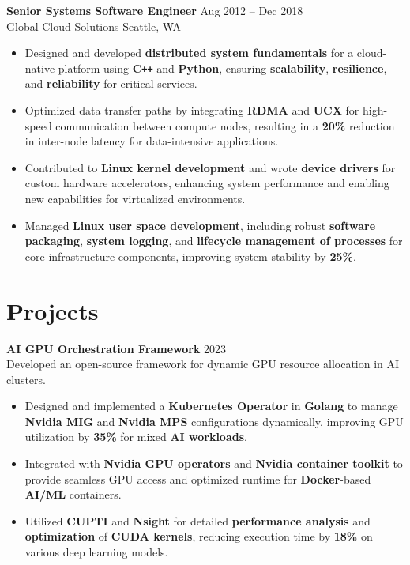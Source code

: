 \documentclass[11pt,a4paper]{article}
\begin{document}
\textbf{Senior Systems Software Engineer} \hfill Aug 2012 – Dec 2018 \\
Global Cloud Solutions \hfill Seattle, WA
\begin{itemize}
    \item Designed and developed \textbf{distributed system fundamentals} for a cloud-native platform using \textbf{C\texttt{++}} and \textbf{Python}, ensuring \textbf{scalability}, \textbf{resilience}, and \textbf{reliability} for critical services.
    \item Optimized data transfer paths by integrating \textbf{RDMA} and \textbf{UCX} for high-speed communication between compute nodes, resulting in a \textbf{20\%} reduction in inter-node latency for data-intensive applications.
    \item Contributed to \textbf{Linux kernel development} and wrote \textbf{device drivers} for custom hardware accelerators, enhancing system performance and enabling new capabilities for virtualized environments.
    \item Managed \textbf{Linux user space development}, including robust \textbf{software packaging}, \textbf{system logging}, and \textbf{lifecycle management of processes} for core infrastructure components, improving system stability by \textbf{25\%}.
\end{itemize}

\section*{Projects}
\textbf{AI GPU Orchestration Framework} \hfill 2023 \\
Developed an open-source framework for dynamic GPU resource allocation in AI clusters.
\begin{itemize}
    \item Designed and implemented a \textbf{Kubernetes Operator} in \textbf{Golang} to manage \textbf{Nvidia MIG} and \textbf{Nvidia MPS} configurations dynamically, improving GPU utilization by \textbf{35\%} for mixed \textbf{AI workloads}.
    \item Integrated with \textbf{Nvidia GPU operators} and \textbf{Nvidia container toolkit} to provide seamless GPU access and optimized runtime for \textbf{Docker}-based \textbf{AI/ML} containers.
    \item Utilized \textbf{CUPTI} and \textbf{Nsight} for detailed \textbf{performance analysis} and \textbf{optimization} of \textbf{CUDA kernels}, reducing execution time by \textbf{18\%} on various deep learning models.
\end{itemize}
\end{document}
